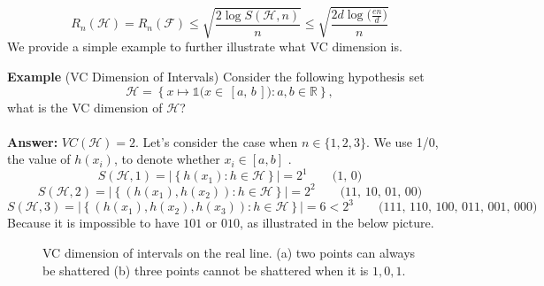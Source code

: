 \documentclass[11pt]{article}
\theoremstyle{definition}
\theoremstyle{remark}
\begin{document}
\[R_n(\mathcal{H}) = R_n(\mathcal{F}) \leq \sqrt{\frac{2\log {S(\mathcal{H}, n)} }{n}} \leq \sqrt{\frac{2d\log{\big(\frac{en}{d}\big) } }{n}}\]
We provide a simple example to further illustrate what VC dimension is.\\
\begin{tcolorbox}[standard jigsaw, opacityback=0]
\textbf{Example} (VC Dimension of Intervals) Consider the following hypothesis set
\[\mathcal{H} = \left\{x \longmapsto \mathds{1}\big(x \in \,[a,\, b\,]\big) : a, b \in \mathbb{R}\right\},\] what is the VC dimension of $\mathcal{H}$?\\\\
\textbf{Answer:} $VC(\mathcal{H}) = 2$. Let's consider the case when $n \in \{1, 2, 3\}$. We use 1/0, the value of $h(x_i)$, to denote whether $x_i \in [a, b]$ .\\
\[S(\mathcal{H}, 1) = \bigg| \left\{ h(x_1) : h \in \mathcal{H} \right\}\bigg| = 2^1 \qquad \text{(1, 0)}\]
\[S(\mathcal{H}, 2) = \bigg| \left\{ (h(x_1), h(x_2)) : h \in \mathcal{H} \right\}\bigg| = 2^2 \qquad \text{(11, 10, 01, 00)}\]
\[S(\mathcal{H}, 3) = \bigg| \left\{ (h(x_1), h(x_2), h(x_3)) : h \in \mathcal{H} \right\}\bigg| =6 < 2^3 \qquad \text{(111, 110, 100, 011, 001, 000)}\]
Because it is impossible to have $101$ or $010$, as illustrated in the below picture. \begin{figure}[H]
  \centering
  \hspace{1in}
  \caption{VC dimension of intervals on the real line. (a) two points can always be shattered (b) three points cannot be shattered when it is $1, 0, 1$.}
  \label{fig:subfig} %
\end{figure}
\end{tcolorbox}
\end{document}
